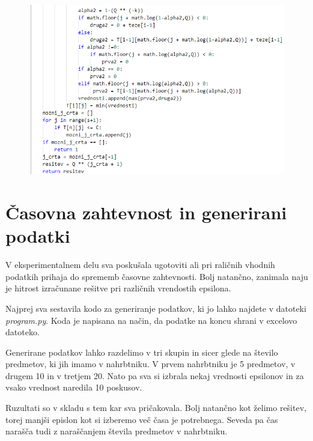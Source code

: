 \documentclass[a4paper,12pt]{article}
\begin{document}
\newpage

\begin{figure}[h]
\centering
\includegraphics[width=1.0\textwidth]{koda2}
\end{figure}

\newpage

\section{Časovna zahtevnost in generirani podatki}

\noindent V eksperimentalnem delu  sva poskušala ugotoviti ali pri raličnih vhodnih podatkih prihaja do sprememb časovne zahtevnosti.  Bolj natančno, zanimala naju je hitrost izračunane rešitve  pri različnih vrendostih epsilona. 

\noindent Najprej sva sestavila kodo za generiranje podatkov, ki jo lahko najdete v datoteki \textit{program.py}.  Koda je napisana na način, da podatke na koncu shrani v excelovo datoteko.
\vspace {3mm}

\noindent Generirane podatkov lahko razdelimo v tri skupin in sicer glede na število predmetov, ki jih imamo v nahrbtniku.
\noindent V prvem nahrbtniku je 5 predmetov, v drugem 10 in v tretjem 20. Nato pa sva si izbrala nekaj vrednosti epsilonov in za vsako vrednost naredila 10 poskusov.
\vspace{3mm}

\noindent Ruzultati so v skladu s tem kar sva pričakovala. Bolj natančno kot želimo rešitev, torej manjši epislon kot si izberemo več časa je potrebnega.
\noindent Seveda pa čas narašča tudi z naraščanjem števila predmetov v nahrbtniku.
\vspace{3mm}
\end{document}
